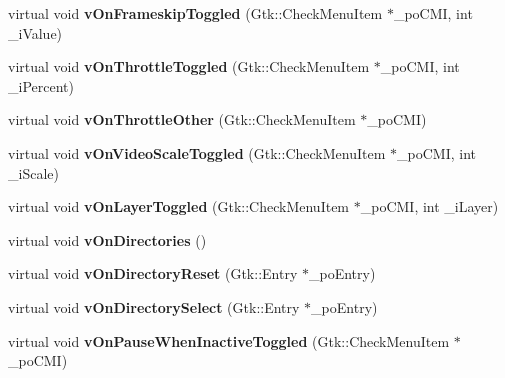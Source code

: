 \begin{DoxyCompactItemize}
virtual void {\bfseries v\+On\+Frameskip\+Toggled} (Gtk\+::\+Check\+Menu\+Item $\ast$\+\_\+po\+C\+MI, int \+\_\+i\+Value)
\item 
\mbox{\label{class_v_b_a_1_1_window_a86f6a68bfbf9928605aa80a543d49038}} 
virtual void {\bfseries v\+On\+Throttle\+Toggled} (Gtk\+::\+Check\+Menu\+Item $\ast$\+\_\+po\+C\+MI, int \+\_\+i\+Percent)
\item 
\mbox{\label{class_v_b_a_1_1_window_a3d2033ebb1a3ef25bada10bef93e856a}} 
virtual void {\bfseries v\+On\+Throttle\+Other} (Gtk\+::\+Check\+Menu\+Item $\ast$\+\_\+po\+C\+MI)
\item 
\mbox{\label{class_v_b_a_1_1_window_af0072d4a223c1a543dd5ce0933a72804}} 
virtual void {\bfseries v\+On\+Video\+Scale\+Toggled} (Gtk\+::\+Check\+Menu\+Item $\ast$\+\_\+po\+C\+MI, int \+\_\+i\+Scale)
\item 
\mbox{\label{class_v_b_a_1_1_window_aabcf3fafc945b040ac1f775cb32a7245}} 
virtual void {\bfseries v\+On\+Layer\+Toggled} (Gtk\+::\+Check\+Menu\+Item $\ast$\+\_\+po\+C\+MI, int \+\_\+i\+Layer)
\item 
\mbox{\label{class_v_b_a_1_1_window_ab0ff6c3b3ac5df7ab482be673ac02732}} 
virtual void {\bfseries v\+On\+Directories} ()
\item 
\mbox{\label{class_v_b_a_1_1_window_aedc6f08a9c1f1a54ec41347f96dfd213}} 
virtual void {\bfseries v\+On\+Directory\+Reset} (Gtk\+::\+Entry $\ast$\+\_\+po\+Entry)
\item 
\mbox{\label{class_v_b_a_1_1_window_ab2aa067d967ea52a685574fc09c11f33}} 
virtual void {\bfseries v\+On\+Directory\+Select} (Gtk\+::\+Entry $\ast$\+\_\+po\+Entry)
\item 
\mbox{\label{class_v_b_a_1_1_window_aec8ba72231d668912f3b71353925f2f2}} 
virtual void {\bfseries v\+On\+Pause\+When\+Inactive\+Toggled} (Gtk\+::\+Check\+Menu\+Item $\ast$\+\_\+po\+C\+MI)
\item 
\mbox{\label{class_v_b_a_1_1_window_a5d20c67c2118e4a18e97cab4ba111c65}} 

\end{DoxyCompactItemize}
